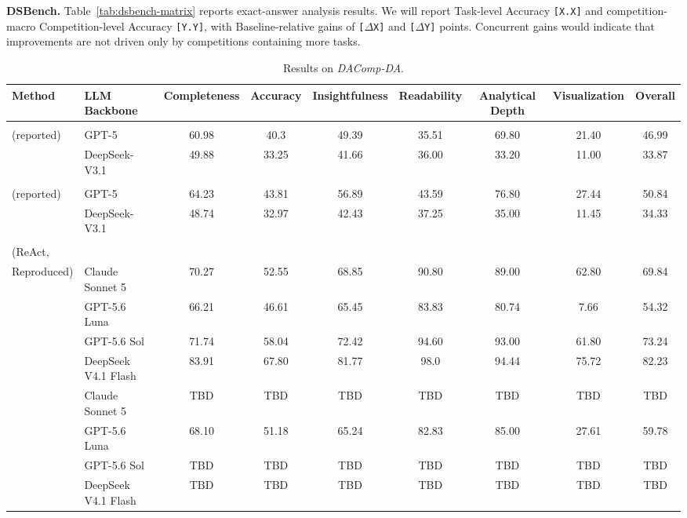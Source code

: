 \documentclass{article}
\newcommand{\method}{\textsc{Ours}}
\newcommand{\tabmethodreported}[1]{\makecell[l]{#1\\(reported)}}
\newcommand{\tabmethodbaseline}{\makecell[l]{Baseline\\(ReAct,\\Reproduced)}}
\begin{document}
\noindent\textbf{DSBench.}
Table~\ref{tab:dsbench-matrix} reports exact-answer analysis results.
We will report Task-level Accuracy \texttt{[X.X]} and competition-macro Competition-level Accuracy \texttt{[Y.Y]}, with Baseline-relative gains of \texttt{[$\Delta$X]} and \texttt{[$\Delta$Y]} points.
Concurrent gains would indicate that improvements are not driven only by competitions containing more tasks.

\begin{table}[t]
  \caption{Results on \textit{DAComp-DA}.}
  \label{tab:dacomp-matrix}
  \centering
  \scriptsize
  \setlength{\tabcolsep}{2.5pt}
  \begin{tabular}{@{}>{\raggedright\arraybackslash}l>{\raggedright\arraybackslash}lccccccc@{}}
    \toprule
    Method & LLM Backbone & Completeness & Accuracy & Insightfulness & Readability & Analytical Depth & Visualization & Overall \\
    \midrule
    \multirow{2}{*}{\tabmethodreported{OpenHands}} & GPT-5 & 60.98 & 40.3 & 49.39 & 35.51 & 69.80 & 21.40 & 46.99 \\
      & DeepSeek-V3.1 & 49.88 & 33.25 & 41.66 & 36.00 & 33.20 & 11.00 & 33.87 \\
    \midrule
    \multirow{2}{*}{\tabmethodreported{DA-Agent}} & GPT-5 & 64.23 & 43.81 & 56.89 & 43.59 & 76.80 & 27.44 & 50.84 \\
      & DeepSeek-V3.1 & 48.74 & 32.97 & 42.43 & 37.25 & 35.00 & 11.45 & 34.33 \\
    \midrule
    \multirow{4}{*}{\tabmethodbaseline}
      & Claude Sonnet 5 & 70.27 & 52.55 & 68.85 & 90.80 & 89.00 & 62.80 & 69.84 \\
      & GPT-5.6 Luna & 66.21 & 46.61 & 65.45 & 83.83 & 80.74 & 7.66 & 54.32 \\
      & GPT-5.6 Sol & 71.74 & 58.04 & 72.42 & 94.60 & 93.00 & 61.80 & 73.24 \\
      & DeepSeek V4.1 Flash & 83.91 & 67.80 & 81.77 & 98.0 & 94.44 & 75.72 & 82.23 \\
    \midrule
    \multirow{4}{*}{\method{}}
      & Claude Sonnet 5 & TBD & TBD & TBD & TBD & TBD & TBD & TBD \\
      & GPT-5.6 Luna & 68.10 & 51.18 & 65.24 & 82.83 & 85.00 & 27.61 & 59.78 \\
      & GPT-5.6 Sol & TBD & TBD & TBD & TBD & TBD & TBD & TBD \\
      & DeepSeek V4.1 Flash & TBD & TBD & TBD & TBD & TBD & TBD & TBD \\
    \bottomrule
  \end{tabular}


\end{table}
\end{document}
